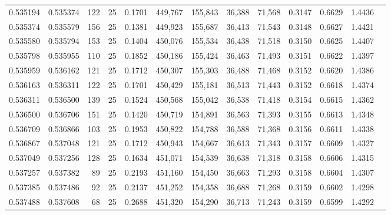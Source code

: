 \begin{tabular}{rrrrrrrrrrrrr}
0.535194 & 0.535374 &   122 &  25 &                                     0.1701 & 449,767 & 155,843 &  36,388 &  71,568 & 0.3147 & 0.6629 & 1.4436 \\
0.535374 & 0.535579 &   156 &  25 &                                     0.1381 & 449,923 & 155,687 &  36,413 &  71,543 & 0.3148 & 0.6627 & 1.4421 \\
0.535580 & 0.535794 &   153 &  25 &                                     0.1404 & 450,076 & 155,534 &  36,438 &  71,518 & 0.3150 & 0.6625 & 1.4407 \\
0.535798 & 0.535955 &   110 &  25 &                                     0.1852 & 450,186 & 155,424 &  36,463 &  71,493 & 0.3151 & 0.6622 & 1.4397 \\
0.535959 & 0.536162 &   121 &  25 &                                     0.1712 & 450,307 & 155,303 &  36,488 &  71,468 & 0.3152 & 0.6620 & 1.4386 \\
0.536163 & 0.536311 &   122 &  25 &                                     0.1701 & 450,429 & 155,181 &  36,513 &  71,443 & 0.3152 & 0.6618 & 1.4374 \\
0.536311 & 0.536500 &   139 &  25 &                                     0.1524 & 450,568 & 155,042 &  36,538 &  71,418 & 0.3154 & 0.6615 & 1.4362 \\
0.536500 & 0.536706 &   151 &  25 &                                     0.1420 & 450,719 & 154,891 &  36,563 &  71,393 & 0.3155 & 0.6613 & 1.4348 \\
0.536709 & 0.536866 &   103 &  25 &                                     0.1953 & 450,822 & 154,788 &  36,588 &  71,368 & 0.3156 & 0.6611 & 1.4338 \\
0.536867 & 0.537048 &   121 &  25 &                                     0.1712 & 450,943 & 154,667 &  36,613 &  71,343 & 0.3157 & 0.6609 & 1.4327 \\
0.537049 & 0.537256 &   128 &  25 &                                     0.1634 & 451,071 & 154,539 &  36,638 &  71,318 & 0.3158 & 0.6606 & 1.4315 \\
0.537257 & 0.537382 &    89 &  25 &                                     0.2193 & 451,160 & 154,450 &  36,663 &  71,293 & 0.3158 & 0.6604 & 1.4307 \\
0.537385 & 0.537486 &    92 &  25 &                                     0.2137 & 451,252 & 154,358 &  36,688 &  71,268 & 0.3159 & 0.6602 & 1.4298 \\
0.537488 & 0.537608 &    68 &  25 &                                     0.2688 & 451,320 & 154,290 &  36,713 &  71,243 & 0.3159 & 0.6599 & 1.4292 \\

\end{tabular}
